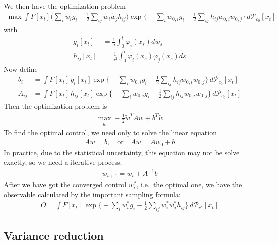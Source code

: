 \documentclass[aip,jcp,a4paper,reprint,onecolumn]{revtex4-1}
\newcommand{\pathmeas}{d\mathcal P}
\begin{document}
We then have the optimization problem
\begin{align}
  \max \int F[x_t]
  \Big ( \sum_i \tilde w_i g_i - \frac12\sum_{ij} \tilde w_i\tilde w_j h_{ij} \Big)
  \exp \Big\{
  - \sum_i w_{0,i} g_i - \frac 12 \sum_{ij} h_{ij} w_{0,i}    w_{0,j} \Big\}
  \,\pathmeas_{c_0}[x_t]
\end{align}
with
\begin{align}\label{eqn:gi}
  g_i[x_t] & = \frac 1\sigma\int_0^t \varphi_i(x_s) dw_s \\\label{eqn:hij}
  h_{ij}[x_t] & = \frac1{\sigma^2} \int_0^t \varphi_i(x_s)  \varphi_j(x_s) ds
\end{align}
Now define
\begin{align}
  b_i & = \int F[x_t]\, g_{i}[x_t] \exp \Big\{
  - \sum_i w_{0,i} g_i - \frac 12 \sum_{ij} h_{ij} w_{0,i}    w_{0,j} \Big\}
  \,\pathmeas_{c_0}[x_t]\\
  A_{ij} & = \int F[x_t]\, h_{ij}[x_t] \exp \Big\{
  - \sum_i w_{0,i} g_i - \frac 12 \sum_{ij} h_{ij} w_{0,i}    w_{0,j} \Big\}
  \,\pathmeas_{c_0}[x_t]
\end{align}
Then the optimization problem is
\begin{align}
  \max_{\tilde w } -\frac 12 \tilde w^T A w + b^T \tilde w
\end{align}
To find the optimal control, we need only to solve the linear equation
\begin{align}
  A\tilde w = b, \quad \textrm{or}\quad A w = A w_0 + b
\end{align}
In practice, due to the statistical uncertainty, this equation may not
be solve exactly, so we need a iterative process:
\begin{align}
  w_{i+1} = w_i + A^{-1}b
\end{align}
After we have got the converged control $w_i^\ast$,
i.e.~the optimal one, we have
the observable calculated by the important sampling formula:
\begin{align}\label{eqn:import-samp}
  O = \int F[x_t]\,
  \exp\Big\{
  -\sum_iw^\ast_i g_i -\frac12\sum_{ij}w^\ast_iw^\ast_jh_{ij}
  \Big\}\,
  \pathmeas_{c^\ast}[x_t]
\end{align}


\subsection{Variance reduction}
\end{document}
